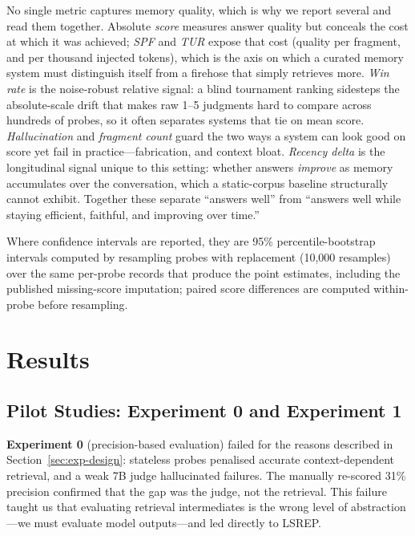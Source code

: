 \documentclass[10pt]{article}
\begin{document}
No single metric captures memory quality, which is why we report several and read them together. Absolute \emph{score} measures answer quality but conceals the cost at which it was achieved; \emph{SPF} and \emph{TUR} expose that cost (quality per fragment, and per thousand injected tokens), which is the axis on which a curated memory system must distinguish itself from a firehose that simply retrieves more. \emph{Win rate} is the noise-robust relative signal: a blind tournament ranking sidesteps the absolute-scale drift that makes raw 1--5 judgments hard to compare across hundreds of probes, so it often separates systems that tie on mean score. \emph{Hallucination} and \emph{fragment count} guard the two ways a system can look good on score yet fail in practice---fabrication, and context bloat. \emph{Recency delta} is the longitudinal signal unique to this setting: whether answers \emph{improve} as memory accumulates over the conversation, which a static-corpus baseline structurally cannot exhibit. Together these separate ``answers well'' from ``answers well while staying efficient, faithful, and improving over time.''

Where confidence intervals are reported, they are 95\% percentile-bootstrap intervals computed by resampling probes with replacement (10{,}000 resamples) over the same per-probe records that produce the point estimates, including the published missing-score imputation; paired score differences are computed within-probe before resampling.

\section{Results}
\label{sec:results}

\subsection{Pilot Studies: Experiment 0 and Experiment 1}
\label{sec:exp1}

\textbf{Experiment 0} (precision-based evaluation) failed for the reasons described in Section~\ref{sec:exp-design}: stateless probes penalised accurate context-dependent retrieval, and a weak 7B judge hallucinated failures. The manually re-scored 31\% precision confirmed that the gap was the judge, not the retrieval. This failure taught us that evaluating retrieval intermediates is the wrong level of abstraction---we must evaluate model outputs---and led directly to LSREP.
\end{document}

